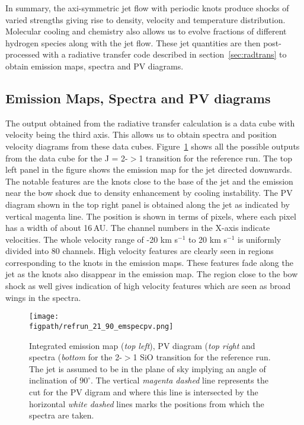 \documentclass[useAMS,usenatbib]{mn2e}
\newcommand{\figpath}{/Users/bhargavvaidya/MyProject/work/Leeds_Uni/SiOJets_New/PAPER/PFIGS/}
\begin{document}
In summary, the axi-symmetric jet flow with periodic knots 
produce shocks of varied strengths giving rise to density, velocity and
temperature distribution. Molecular cooling and chemistry also 
allows us to evolve fractions of different hydrogen species along with the jet
flow. These jet quantities are then post-processed with a radiative
transfer code described in section~\ref{sec:radtrans} to obtain emission maps,
spectra and PV diagrams.



\subsection{Emission Maps, Spectra and PV diagrams}
\label{ssec:emspecpv}
The output obtained from the radiative transfer calculation is a data
cube with velocity being the third axis. This allows us to obtain
spectra and position velocity diagrams from these data cubes. 
Figure~\ref{empvspec90} shows all the possible outputs from the data
cube for the J = 2-$>$1 transition for the reference run. 
The top left panel in the figure shows the emission map for the jet
directed downwards. The notable features are the knots close to the
base of the jet and the emission near the bow shock due to density
enhancement by cooling instability. The PV diagram shown in the top
right panel is obtained along the jet as indicated by vertical magenta
line. The position is shown in terms of pixels, where each pixel has a
width of about 16\,AU. The channel numbers in the X-axis indicate
velocities. The whole velocity range of -20 km s$^{-1}$ to 20 km
s$^{-1}$ is uniformly divided into 80 channels. High velocity features
are clearly seen in regions corresponding to the knots in the emission
maps. These features fade along the jet as the knots also disappear in
the emission map. The region close to the bow shock as well gives
indication of high velocity features which are seen as broad wings in
the spectra. 
%

\begin{figure}
 \texttt{[image: \\figpath/refrun\_21\_90\_emspecpv.png]}
 \caption{Integrated emission map ({\it top left}), PV diagram ({\it top right}
   and spectra ({\it bottom} for the
   2-$>$1 SiO transition for the reference run. 
   The jet is assumed to be in the plane of sky implying an angle of
   inclination of $90^{\circ}$. The vertical {\it magenta dashed} line represents the cut for the PV digram and where this line is intersected by the horizontal
 {\it white dashed} lines marks the positions from which the spectra are taken.} 
\label{empvspec90}
\end{figure}
\end{document}
